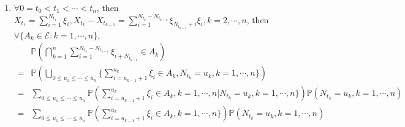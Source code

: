 \documentclass{ctexart}
\begin{document}
\begin{solution}
\begin{enumerate}
      Last, we will prove that \(\{\xi_{N_s + n}:n \in \mathbb{N}^+\}\) are independent with \((N_{t + s}-N_s:t \geq 0)\).
      \(\forall \{A_n \in \mathscr{E}:n \in \mathbb{N}^+\}, k \in \mathbb{N}\), then let \(N_1 \subset \mathbb{N},N_2 \subset [0,+\infty ), |N_1|<\infty,|N_2|<\infty\), \(\{k_t \geq 0:t \in N_2\}\).
      \(\mathbb{P}(\bigcap_{n \in N_1}\{\xi_{N_s + n} \in A_n\}\cap \bigcap_{t \in N_2}\{\{N_{t + s}-N_{s}=k_t\}\})=
      \mathbb{P}(\bigcup_{i \in \mathbb{N}}(\bigcap_{n \in \mathbb{N}^+}\{\xi_{i + n} \in A_n\}\cap \bigcap_{t \in N_2}\{N_{t + s}=k + i,N_s=k\}))=
      \sum_{i \in \mathbb{N}}\mathbb{P}(\bigcap_{n \in \mathbb{N}^+}\{\xi_{i + n} \in A_n\}\cap \bigcap_{t \in N_2}\{N_{t + s}=k + i, N_s =i\})=
      \sum_{i \in \mathbb{N}}\mathbb{P}(\bigcap_{n \in \mathbb{N}^+}\{\xi_{i + n} \in A_n\})\mathbb{P}(N_{t + s}=k + i, N_s =i, t \in N_2)=
      \sum_{i \in \mathbb{N}}\prod_{n \in \mathbb{N}^+}\mathbb{P}(\xi_{1 + n} \in A_n)\mathbb{P}(N_{t + s}=k + i, N_s=i)=
      \prod_{n \in \mathbb{N}^+}\mathbb{P}(\xi_{1 + n} \in A_n)\mathbb{P}(N_{t + s}-N_s=k)=
      \prod_{n \in \mathbb{N}^+}\mathbb{P}(\xi_{N_s + n} \in A_n)\mathbb{P}(N_{t + s}-N_s=k)=
      \mathbb{P}(\bigcap_{n \in \mathbb{N}^+}\{\xi_{N_s + n} \in A_n\})\mathbb{P}(N_{t + s}-N_s=k)\).
    \item \(\forall 0 = t_0<t_1<\cdots<t_n\), then \(X_{t_1}=\sum_{i =1}^{N_{t_1}}\xi_i,X_{t_k}-X_{t_{k-1}}=\sum_{i=1}^{N_{t_k}-N_{t_{k-1}}}\xi_{N_{t_{k-1}} + i}\xi_i,k=2,\cdots,n\),
      then \(\forall\{A_k \in \mathscr{E}:k=1,\cdots,n\}\),
      \begin{equation}
        \begin{aligned}
            & \mathbb{P}(\bigcap_{k =1}^n \sum_{i=1}^{N_{t_k}-N_{t_{k-1}}}\xi_{i + N_{t_{k-1}}} \in A_k)                                                                                              \\
          = & \mathbb{P}(\bigcup_{0 \leq u_1\leq \cdots\leq u_n}\{\sum_{i=u_{k-1}+1}^{u_k}\xi_{i} \in A_k,N_{t_k}=u_k,k=1,\cdots,n\})                                                                 \\
          = & \sum_{0 \leq u_1\leq \cdots\leq u_n}\mathbb{P}(\sum_{i=u_{k-1} + 1}^{u_k}\xi_i  \in A_k, k=1,\cdots,n| N_{t_k}=u_k,k=1,\cdots,n\})\mathbb{P}(N_{t_{k}}=u_k,k=1,\cdots,n)                \\
          = & \sum_{0 \leq u_1\leq \cdots\leq u_n}\mathbb{P}(\sum_{i=u_{k-1} + 1}^{u_k}\xi_i  \in A_k, k=1,\cdots,n\})\mathbb{P}(N_{t_{k}}=u_k,k=1,\cdots,n)                                          \\

\end{aligned}
\end{equation}
\end{enumerate}
\end{solution}
\end{document}
